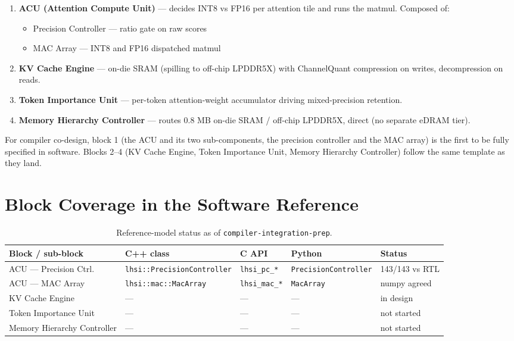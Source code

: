 \documentclass[11pt]{article}
\begin{document}
\begin{enumerate}
\item \textbf{ACU (Attention Compute Unit)} --- decides INT8 vs FP16
      per attention tile and runs the matmul. Composed of:
      \begin{itemize}
      \item Precision Controller --- ratio gate on raw scores
      \item MAC Array --- INT8 and FP16 dispatched matmul
      \end{itemize}
\item \textbf{KV Cache Engine} --- on-die SRAM (spilling to off-chip LPDDR5X) with
      ChannelQuant compression on writes, decompression on reads.
\item \textbf{Token Importance Unit} --- per-token attention-weight
      accumulator driving mixed-precision retention.
\item \textbf{Memory Hierarchy Controller} --- routes 0.8 MB on-die SRAM /
      off-chip LPDDR5X, direct (no separate eDRAM tier).
\end{enumerate}

For compiler co-design, block 1 (the ACU and its two sub-components,
the precision controller and the MAC array) is the first to be fully
specified in software. Blocks 2--4 (KV Cache Engine, Token Importance
Unit, Memory Hierarchy Controller) follow the same template as they
land.

\section{Block Coverage in the Software Reference}
\label{sec:coverage}

\begin{table}[ht]
\centering
\footnotesize
\caption{Reference-model status as of \texttt{compiler-integration-prep}.}
\label{tab:coverage}
\setlength{\tabcolsep}{4pt}
\begin{tabular}{@{}p{3.0cm} p{4.0cm} p{1.8cm} p{3.3cm} p{2.3cm}@{}}
\toprule
Block / sub-block           & C++ class                          & C API                 & Python                       & Status \\
\midrule
ACU --- Precision Ctrl.     & \texttt{lhsi::PrecisionController} & \texttt{lhsi\_pc\_*}  & \texttt{PrecisionController} & 143/143 vs RTL \\
ACU --- MAC Array           & \texttt{lhsi::mac::MacArray}       & \texttt{lhsi\_mac\_*} & \texttt{MacArray}            & numpy agreed \\
KV Cache Engine             & ---                                & ---                   & ---                          & in design \\
Token Importance Unit       & ---                                & ---                   & ---                          & not started \\
Memory Hierarchy Controller & ---                                & ---                   & ---                          & not started \\
\bottomrule
\end{tabular}
\end{table}
\end{document}
